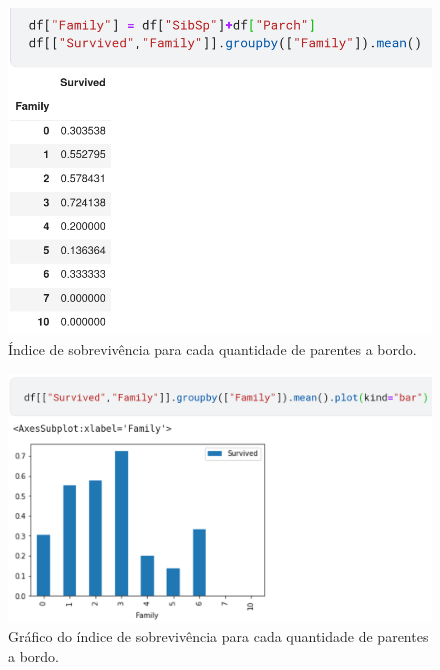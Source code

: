 \begin{figure}[H]
\centering
\includegraphics[width=\textwidth]{Figures/family_groupby.png}
\caption{\label{family.groupby}Índice de sobrevivência para cada quantidade de parentes a bordo.}
\end{figure}
\begin{figure}[H]
\centering
\includegraphics[width=\textwidth]{Figures/family_survivor_plot.png}
\caption{\label{df.groupby.plot}Gráfico do índice de sobrevivência para cada quantidade de parentes a bordo.}
\end{figure}

